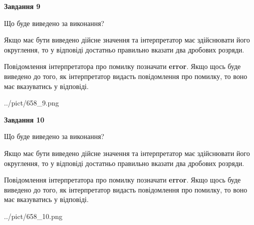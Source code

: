 \documentclass[12pt, ukrainian]{article}
\begin{document}
{\begin {Large}
{\begin {center}\textbf{Завдання 9}\end {center}}\par
Що буде виведено за виконання? \par

Якщо має бути виведено дійсне значення та інтерпретатор має здійснювати його округлення, 
то у відповіді достатньо правильно вказати два дробових розряди.

Повідомлення інтерпретатора про помилку позначати \textbf{error}.
Якщо щось буде виведено до того, як інтерпретатор видасть повідомлення про помилку, 
то воно має вказуватись у відповіді. \par

\begin{center}
	{../pict/658_9.png}
\end{center}
\newpage

{\begin {center}\textbf{Завдання 10}\end {center}}\par
Що буде виведено за виконання? \par

Якщо має бути виведено дійсне значення та інтерпретатор має здійснювати його округлення, 
то у відповіді достатньо правильно вказати два дробових розряди.

Повідомлення інтерпретатора про помилку позначати \textbf{error}.
Якщо щось буде виведено до того, як інтерпретатор видасть повідомлення про помилку, 
то воно має вказуватись у відповіді. \par

\begin{center}
	{../pict/658_10.png}
\end{center}
\newpage

\end {Large}}
\end{document}
